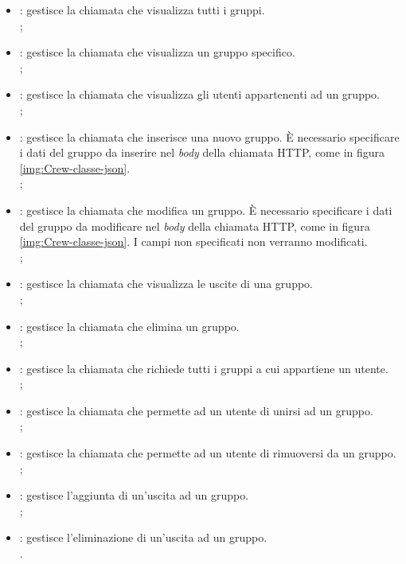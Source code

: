 \begin{itemize}
    \item {}: gestisce la chiamata che visualizza tutti i gruppi.\\ ;
    \item {}:  gestisce la chiamata che visualizza un gruppo specifico. \\ ;
    \item {}: gestisce la chiamata che visualizza gli utenti appartenenti ad un gruppo. \\ ;
    \item {}: gestisce la chiamata che inserisce una nuovo gruppo. È necessario specificare i dati del gruppo da inserire nel \textit{body} della chiamata HTTP, come in figura \ref{img:Crew-classe-json}.   \\ ;
    \item {}: gestisce la chiamata che modifica un gruppo. È necessario specificare i dati del gruppo da modificare nel \textit{body} della chiamata HTTP, come in figura \ref{img:Crew-classe-json}. I campi non specificati non verranno modificati. \\ ;
    \item {}: gestisce la chiamata che visualizza le uscite di una gruppo.\\ ;
    \item {}: gestisce la chiamata che elimina un gruppo. \\ ;
    \item {}: gestisce la chiamata che richiede tutti i gruppi a cui appartiene un utente. \\ ;
    \item {}: gestisce la chiamata che permette ad un utente di unirsi ad un gruppo. \\ ;
    \item {}: gestisce la chiamata che permette ad un utente di rimuoversi da un gruppo. \\ ;
    \item {}:  gestisce l'aggiunta di un'uscita ad un gruppo. \\ ;
    \item {}: gestisce l'eliminazione di un'uscita ad un gruppo. \\ .  
\end{itemize}


